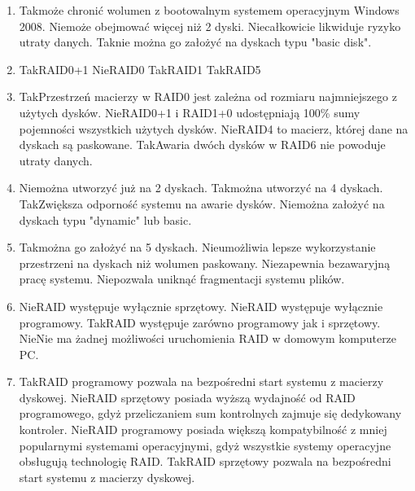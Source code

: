 \begin{enumerate}
		{Nie}{konfiguracja typu stripped volume}%
		{Tak}{konfiguracja typu RAID5}%
		{Tak}{konfiguracja typu mirror}%
		{Nie}{konfiguracja typu spanned volume}
		\item {}%
		{Tak}{może chronić wolumen z bootowalnym systemem operacyjnym Windows 2008.}%
		{Nie}{może obejmować więcej niż 2 dyski.}%
		{Nie}{całkowicie likwiduje ryzyko utraty danych.}%
		{Tak}{nie można go założyć na dyskach typu "basic disk".}
		\item {}%
		{Tak}{RAID0+1}%
		{Nie}{RAID0}%
		{Tak}{RAID1}%
		{Tak}{RAID5}
		\item {}%
		{Tak}{Przestrzeń macierzy w RAID0 jest zależna od rozmiaru najmniejszego z użytych dysków.}%
		{Nie}{RAID0+1 i RAID1+0 udostępniają 100\% sumy pojemności wszystkich użytych dysków.}%
		{Nie}{RAID4 to macierz, której dane na dyskach są paskowane.}%
		{Tak}{Awaria dwóch dysków w RAID6 nie powoduje utraty danych.}
		\item {}%
		{Nie}{można utworzyć już na 2 dyskach.}%
		{Tak}{można utworzyć na 4 dyskach.}%
		{Tak}{Zwiększa odporność systemu na awarie dysków.}%
		{Nie}{można założyć na dyskach typu "dynamic" lub basic.}
		\item {}%
		{Tak}{można go założyć na 5 dyskach.}%
		{Nie}{umożliwia lepsze wykorzystanie przestrzeni na dyskach niż wolumen paskowany.}%
		{Nie}{zapewnia bezawaryjną pracę systemu.}%
		{Nie}{pozwala uniknąć fragmentacji systemu plików.}
		\item {}%
		{Nie}{RAID występuje wyłącznie sprzętowy.}%
		{Nie}{RAID występuje wyłącznie programowy.}%
		{Tak}{RAID występuje zarówno programowy jak i sprzętowy.}%
		{Nie}{Nie ma żadnej możliwości uruchomienia RAID w domowym komputerze PC.}
		\item {}%
		{Tak}{RAID programowy pozwala na bezpośredni start systemu z macierzy dyskowej.}%
		{Nie}{RAID sprzętowy posiada wyższą wydajność od RAID programowego, gdyż przeliczaniem sum kontrolnych zajmuje się dedykowany kontroler.}%
		{Nie}{RAID programowy posiada większą kompatybilność z mniej popularnymi systemami operacyjnymi, gdyż wszystkie systemy operacyjne obsługują technologię RAID.}%
		{Tak}{RAID sprzętowy pozwala na bezpośredni start systemu z macierzy dyskowej.}

\end{enumerate}
